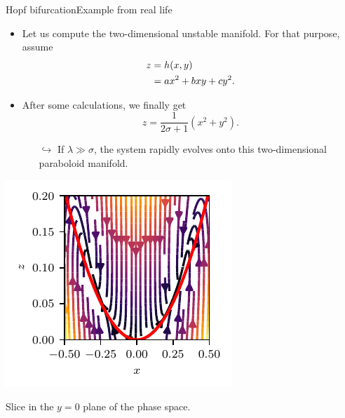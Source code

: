 \documentclass[usenames,dvipsnames,svgnames,10pt,aspectratio=169]{beamer}
\begin{document}
\begin{frame}[t, c]{Hopf bifurcation}{Example from real life}
	\begin{minipage}{.6\textwidth}
		\begin{itemize}
			\item Let us compute the two-dimensional unstable manifold. For that purpose, assume
			\begin{equation}
				\begin{aligned}
					z & = h(x, y) \\
					~ & = a x^2 + b xy + c y^2.
				\end{aligned}
				\notag
			\end{equation}

			\bigskip

			\item After some calculations, we finally get
			$$z = \displaystyle \frac{1}{2\sigma + 1} \left( x^2 + y^2 \right).$$
			\begin{itemize}
				\item[$\hookrightarrow$] If $\lambda \gg \sigma$, the system rapidly evolves onto this two-dimensional paraboloid manifold.
			\end{itemize}
		\end{itemize}
	\end{minipage}%
	\hfill
	\begin{minipage}{.28\textwidth}
		\centering
		\includegraphics[width=.95\textwidth]{generalized_mean_field_model_manifold}

		{\small Slice in the $y=0$ plane of the phase space.}
	\end{minipage}

	\vspace{1cm}
\end{frame}
\end{document}
